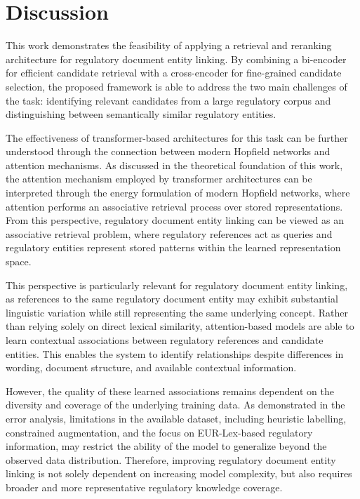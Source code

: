\section{Discussion}

This work demonstrates the feasibility of applying a retrieval and reranking architecture for regulatory document entity linking. By combining a bi-encoder for efficient candidate retrieval with a cross-encoder for fine-grained candidate selection, the proposed framework is able to address the two main challenges of the task: identifying relevant candidates from a large regulatory corpus and distinguishing between semantically similar regulatory entities.

The effectiveness of transformer-based architectures for this task can be further understood through the connection between modern Hopfield networks and attention mechanisms. As discussed in the theoretical foundation of this work, the attention mechanism employed by transformer architectures can be interpreted through the energy formulation of modern Hopfield networks, where attention performs an associative retrieval process over stored representations. From this perspective, regulatory document entity linking can be viewed as an associative retrieval problem, where regulatory references act as queries and regulatory entities represent stored patterns within the learned representation space.

This perspective is particularly relevant for regulatory document entity linking, as references to the same regulatory document entity may exhibit substantial linguistic variation while still representing the same underlying concept. Rather than relying solely on direct lexical similarity, attention-based models are able to learn contextual associations between regulatory references and candidate entities. This enables the system to identify relationships despite differences in wording, document structure, and available contextual information.

However, the quality of these learned associations remains dependent on the diversity and coverage of the underlying training data. As demonstrated in the error analysis, limitations in the available dataset, including heuristic labelling, constrained augmentation, and the focus on EUR-Lex-based regulatory information, may restrict the ability of the model to generalize beyond the observed data distribution. Therefore, improving regulatory document entity linking is not solely dependent on increasing model complexity, but also requires broader and more representative regulatory knowledge coverage.

